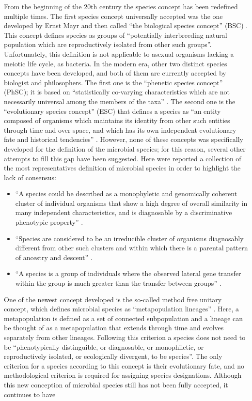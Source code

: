 From the beginning of the 20th century the species concept has been redefined multiple times. The first species concept universally accepted was the one developed by Ernst Mayr and then called ``the biological species concept'' (BSC) \cite{mayr1942systematics}. This concept defines species as groups of ``potentially interbreeding natural population which are reproductively isolated from other such groups''. Unfortunately, this definition is not applicable to asexual organisms lacking a meiotic life cycle, as bacteria. In the modern era, other two distinct species concepts have been developed, and both of them are currently accepted by biologist and philosophers. The first one is the ``phenetic species concept'' (PhSC); it is based on ``statistically co-varying characteristics which are not necessarily universal among the members of the taxa'' \cite{claridge1997species, sokal1970biological}. The second one is the ``evolutionary species concept'' (ESC) that defines a species as ``an entity composed of organisms which maintains its identity from other such entities through time and over space, and which has its own independent evolutionary fate and historical tendencies'' \cite{claridge1997species}. However, none of these concepts was specifically developed for the definition of the microbial species; for this reason, several other attempts to fill this gap have been suggested. Here were reported a collection of the most representatives definition of microbial species in order to highlight the lack of consensus:
\begin{itemize}
\item ``A species could be described as a monophyletic and genomically coherent cluster of individual organisms that show a high degree of overall similarity in many independent characteristics, and is diagnosable by a discriminative phenotypic property'' \cite{rossello2001species}.
\item ``Species are considered to be an irreducible cluster of organisms diagnosably different from other such clusters and within which there is a parental pattern of ancestry and descent'' \cite{staley2006bacterial}.
\item ``A species is a group of individuals where the observed lateral gene transfer within the group is much greater than the transfer between groups'' \cite{dykhuizen2005species}.
\end{itemize}
One of the newest concept developed is the so-called method free unitary concept, which defines microbial species as ``metapopulation lineages'' \cite{de2005ernst}. Here, a metapopulation is defined as a set of connected subpopulation and a lineage can be thought of as a metapopulation that extends through time and evolves separately from other lineages. Following this criterion a species does not need to be ``phenotypically distinguible, or diagnosable, or monophiletic, or reproductively isolated, or ecologically divergent, to be species''. The only criterion for a species according to this concept is their evolutionary fate, and no methodological criterion is required for assigning species designations. Although this new conception of microbial species still has not been fully accepted, it continues to have

